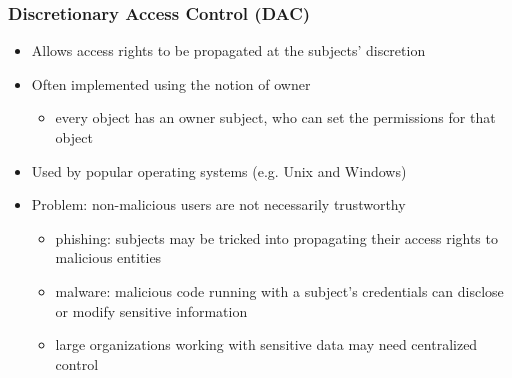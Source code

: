 \documentclass[final]{article}
\begin{document}
\subsubsection*{Discretionary Access Control (DAC)}
\begin{itemize}[nosep]
    \item Allows access rights to be propagated at the subjects' discretion
    \item Often implemented using the notion of owner
          \begin{itemize}[nosep]
              \item every object has an owner subject, who can set the permissions for that object
          \end{itemize}
    \item Used by popular operating systems (e.g. Unix and Windows)
    \item Problem: non-malicious users are not necessarily trustworthy
          \begin{itemize}[nosep]
              \item phishing: subjects may be tricked into propagating their access rights to malicious entities
              \item malware: malicious code running with a subject's credentials can disclose or modify sensitive information
              \item large organizations working with sensitive data may need centralized control
          \end{itemize}
\end{itemize}
\end{document}
